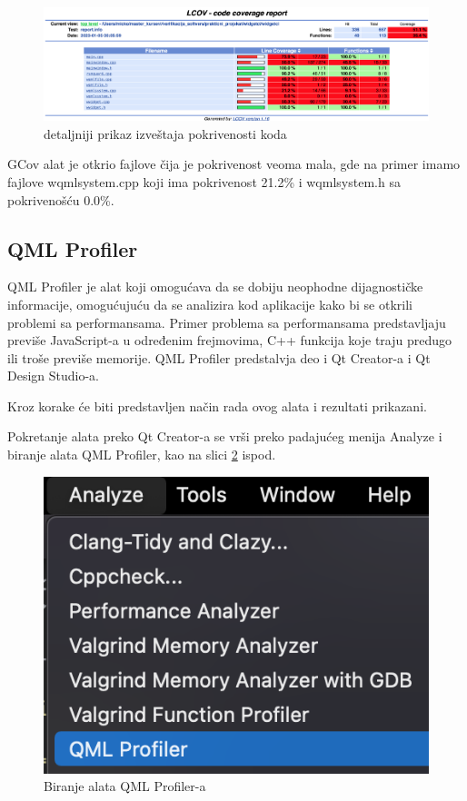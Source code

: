 \documentclass[a4paper]{article}
\begin{document}
\begin{figure}[h!]
\begin{center}
\includegraphics[scale=0.23]{GCov-03.png}
\end{center}
\caption{detaljniji prikaz izveštaja pokrivenosti koda}
\label{fig: GCov-03}
\end{figure}

GCov alat je otkrio fajlove čija je pokrivenost veoma mala, gde na primer imamo fajlove wqmlsystem.cpp koji ima pokrivenost 21.2\% i wqmlsystem.h sa pokrivenošću 0.0\%.

\subsection{QML Profiler}
QML Profiler je alat koji omogućava da se dobiju neophodne dijagnostičke informacije, omogućujuću da se analizira kod aplikacije kako bi se otkrili problemi sa performansama. Primer problema sa performansama predstavljaju previše JavaScript-a u određenim frejmovima, C++ funkcija koje traju predugo ili troše previše memorije.
QML Profiler predstalvja deo i Qt Creator-a i Qt Design Studio-a.

Kroz korake će biti predstavljen način rada ovog alata i rezultati prikazani.

Pokretanje alata preko Qt Creator-a se vrši preko padajućeg menija Analyze i biranje alata QML Profiler, kao na slici \ref{fig: qml-00} ispod.

\begin{figure}[h!]
\begin{center}
\includegraphics[scale=0.45]{qml-prof-00.png}
\end{center}
\caption{Biranje alata QML Profiler-a}
\label{fig: qml-00}
\end{figure}
\end{document}
